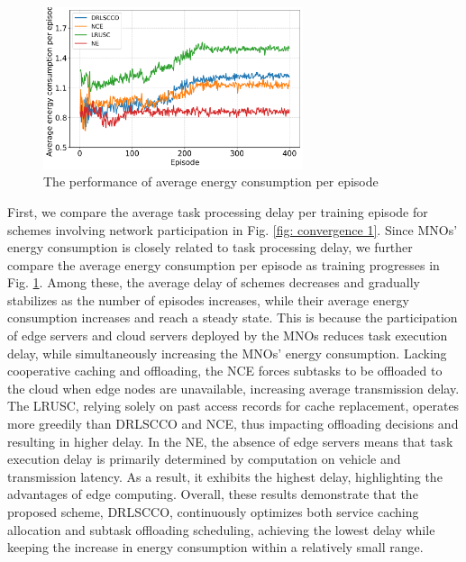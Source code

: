 \documentclass[lettersize,journal]{IEEEtran}
\begin{document}
\begin{figure}
	\centering
	\includegraphics[width=3in]{convergence_energy.png}
	\caption{The performance of average energy consumption per episode}
	\label{fig: convergence 2}
\end{figure}
First, we compare the average task processing delay per training episode for schemes involving network participation in Fig. \ref{fig: convergence 1}.
Since MNOs' energy consumption is closely related to task processing delay, we further compare the average energy consumption per episode as training progresses in Fig. \ref{fig: convergence 2}.  
Among these,  the average delay of  schemes decreases and gradually stabilizes as the number of episodes increases, while their average energy consumption increases and reach a steady state.
This is because the participation of edge servers and cloud servers deployed by the MNOs reduces task execution delay, while simultaneously increasing the MNOs' energy consumption.
Lacking cooperative caching and offloading, the NCE forces subtasks to be offloaded to the cloud when edge nodes are unavailable, increasing average transmission delay.
The LRUSC, relying solely on past access records for cache replacement, operates more greedily than DRLSCCO and NCE, thus impacting offloading decisions and resulting in higher delay.
In the NE, the absence of edge servers means that task execution delay is primarily determined by computation on vehicle and transmission latency. As a result, it exhibits the highest delay, highlighting the advantages of edge computing.
Overall, these results demonstrate that the proposed scheme, DRLSCCO, continuously optimizes both service caching allocation and subtask offloading scheduling, achieving the lowest delay while keeping the increase in energy consumption within a relatively small range.
\end{document}
